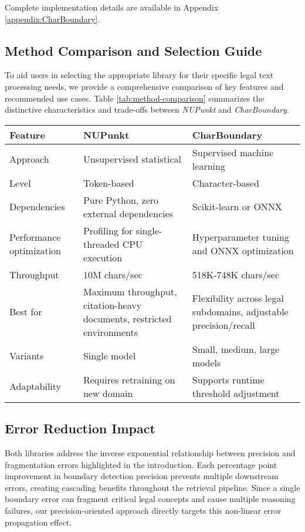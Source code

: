 Complete implementation details are available in Appendix \ref{appendix:CharBoundary}.

\subsection{Method Comparison and Selection Guide}
To aid users in selecting the appropriate library for their specific legal text processing needs, we provide a comprehensive comparison of key features and recommended use cases. Table \ref{tab:method-comparison} summarizes the distinctive characteristics and trade-offs between \textit{NUPunkt} and \textit{CharBoundary}.

\begin{table*}[htbp!]
\centering
\small
\begin{tabular}{p{2.2cm}|p{6.3cm}|p{6.3cm}}
\hline
\textbf{Feature} & \textbf{NUPunkt} & \textbf{CharBoundary} \\
\hline
Approach & Unsupervised statistical & Supervised machine learning \\
\hline
Level & Token-based & Character-based \\
\hline
Dependencies & Pure Python, zero external dependencies & Scikit-learn or ONNX \\
\hline
Performance optimization & Profiling for single-threaded CPU execution & Hyperparameter tuning and ONNX optimization \\
\hline
Throughput & 10M chars/sec & 518K-748K chars/sec \\
\hline
Best for & Maximum throughput, citation-heavy documents, restricted environments & Flexibility across legal subdomains, adjustable precision/recall \\
\hline
Variants & Single model & Small, medium, large models \\
\hline
Adaptability & Requires retraining on new domain & Supports runtime threshold adjustment \\
\hline
\end{tabular}
\caption{Comparison of NUPunkt and CharBoundary features and use cases}
\label{tab:method-comparison}
\end{table*}

\subsection{Error Reduction Impact}
Both libraries address the inverse exponential relationship between precision and fragmentation errors highlighted in the introduction. Each percentage point improvement in boundary detection precision prevents multiple downstream errors, creating cascading benefits throughout the retrieval pipeline. Since a single boundary error can fragment critical legal concepts and cause multiple reasoning failures, our precision-oriented approach directly targets this non-linear error propagation effect.

